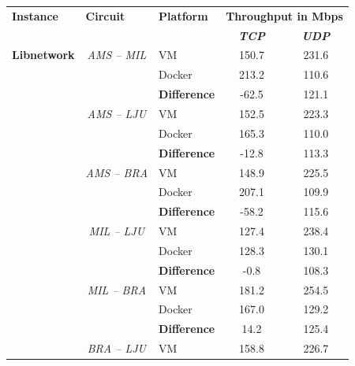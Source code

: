 \begin{appendices}
\setlength\LTleft{0pt}
\setlength\LTright{0pt}
\begin{longtable}{@{\extracolsep{\fill}}lclcc@{}}
\toprule
\textbf{Instance} & \multicolumn{1}{l}{\textbf{Circuit}} & {\color[HTML]{333333} \textbf{Platform}} & \multicolumn{2}{l}{\textbf{Throughput in Mbps}} \\
\textbf{} & \textbf{} & {\color[HTML]{333333} \textbf{}} & \textit{\textbf{TCP}} & \textit{\textbf{UDP}} \\ \midrule
\textbf{Libnetwork} & \textit{AMS – MIL} & {\color[HTML]{333333} VM} & 150.7 & 231.6 \\
 &  & {\color[HTML]{333333} Docker} & 213.2 & 110.6 \\ \cmidrule(l){3-5} 
 &  & {\color[HTML]{333333} \textbf{Difference}} & {\color[HTML]{CB0000} -62.5} & {\color[HTML]{009901} 121.1} \\ \cmidrule(l){2-5} 
 & \textit{AMS – LJU} & {\color[HTML]{333333} VM} & 152.5 & 223.3 \\
 &  & {\color[HTML]{333333} Docker} & 165.3 & 110.0 \\ \cmidrule(l){3-5} 
 &  & {\color[HTML]{333333} \textbf{Difference}} & {\color[HTML]{CB0000} -12.8} & {\color[HTML]{009901} 113.3} \\ \cmidrule(l){2-5} 
 & \textit{AMS – BRA} & {\color[HTML]{333333} VM} & 148.9 & 225.5 \\
 &  & {\color[HTML]{333333} Docker} & 207.1 & 109.9 \\ \cmidrule(l){3-5} 
 &  & {\color[HTML]{333333} \textbf{Difference}} & {\color[HTML]{CB0000} -58.2} & {\color[HTML]{009901} 115.6} \\ \cmidrule(l){2-5} 
 & \textit{MIL – LJU} & {\color[HTML]{333333} VM} & 127.4 & 238.4 \\
 &  & {\color[HTML]{333333} Docker} & 128.3 & 130.1 \\ \cmidrule(l){3-5} 
 &  & {\color[HTML]{333333} \textbf{Difference}} & {\color[HTML]{CB0000} -0.8} & {\color[HTML]{009901} 108.3} \\ \cmidrule(l){2-5} 
 & \textit{MIL – BRA} & {\color[HTML]{333333} VM} & 181.2 & 254.5 \\
 &  & {\color[HTML]{333333} Docker} & 167.0 & 129.2 \\ \cmidrule(l){3-5} 
 &  & {\color[HTML]{333333} \textbf{Difference}} & {\color[HTML]{009901} 14.2} & {\color[HTML]{009901} 125.4} \\ \cmidrule(l){2-5} 
 & \textit{BRA – LJU} & {\color[HTML]{333333} VM} & 158.8 & 226.7 \\

\end{longtable}
\end{appendices}
